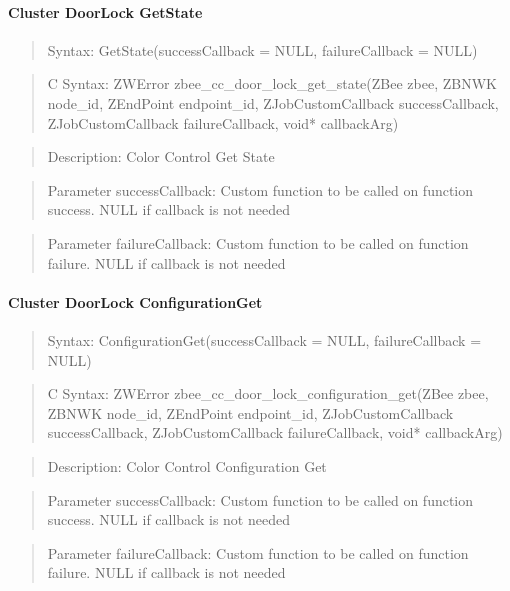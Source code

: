 \paragraph{Cluster DoorLock GetState}
\begin{quote}Syntax: GetState(successCallback = NULL, failureCallback = NULL)\end{quote}
\begin{quote}C Syntax: ZWError zbee\_cc\_door\_lock\_get\_state(ZBee zbee, ZBNWK node\_id, ZEndPoint endpoint\_id, ZJobCustomCallback successCallback, ZJobCustomCallback failureCallback, void* callbackArg)\end{quote}
\begin{quote}Description: Color Control Get State\end{quote}
\begin{quote}Parameter successCallback: Custom function to be called on function success. NULL if callback is not needed\end{quote}
\begin{quote}Parameter failureCallback: Custom function to be called on function failure. NULL if callback is not needed\end{quote}


\paragraph{Cluster DoorLock ConfigurationGet}
\begin{quote}Syntax: ConfigurationGet(successCallback = NULL, failureCallback = NULL)\end{quote}
\begin{quote}C Syntax: ZWError zbee\_cc\_door\_lock\_configuration\_get(ZBee zbee, ZBNWK node\_id, ZEndPoint endpoint\_id, ZJobCustomCallback successCallback, ZJobCustomCallback failureCallback, void* callbackArg)\end{quote}
\begin{quote}Description: Color Control Configuration Get\end{quote}
\begin{quote}Parameter successCallback: Custom function to be called on function success. NULL if callback is not needed\end{quote}
\begin{quote}Parameter failureCallback: Custom function to be called on function failure. NULL if callback is not needed\end{quote}

